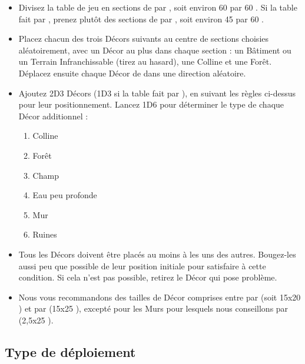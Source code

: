 \begin{itemize}[label={\textbullet}]
\item Divisez la table de jeu en sections de  par , soit environ 60 {\centi\meter} par 60 {\centi\meter}. Si la table fait  par , prenez plutôt des sections de  par , soit environ 45 {\centi\meter} par 60 {\centi\meter}.

\item Placez chacun des trois Décors suivants au centre de sections choisies aléatoirement, avec un Décor au plus dans chaque section : un Bâtiment ou un Terrain Infranchissable (tirez au hasard), une Colline et une Forêt. Déplacez ensuite chaque Décor de  dans une direction aléatoire.

\item Ajoutez 2D3 Décors (1D3 si la table fait  par ), en suivant les règles ci-dessus pour leur positionnement. Lancez 1D6 pour déterminer le type de chaque Décor additionnel :
\begin{enumerate}
\item Colline
\item Forêt
\item Champ
\item Eau peu profonde
\item Mur
\item Ruines
\end{enumerate}

\item Tous les Décors doivent être placés au moins à  les uns des autres. Bougez-les aussi peu que possible de leur position initiale pour satisfaire à cette condition. Si cela n'est pas possible, retirez le Décor qui pose problème.

\item Nous vous recommandons des tailles de Décor comprises entre  par  (soit 15x20 {\centi\meter}) et  par  (15x25 {\centi\meter}), excepté pour les Murs pour lesquels nous conseillons  par  (2,5x25 {\centi\meter}).
\end{itemize}

\newpage
\hypertarget{deploymenttype}{\subsection{Type de déploiement}}

